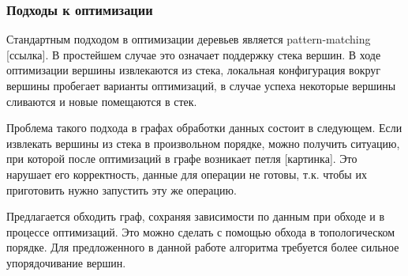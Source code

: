 \subsubsection{Подходы к оптимизации}

Стандартным подходом в оптимизации деревьев является pattern-matching [ссылка]. В простейшем случае это означает поддержку стека вершин. В ходе оптимизации вершины извлекаются из стека, локальная конфигурация вокруг вершины пробегает варианты оптимизаций, в случае успеха некоторые вершины сливаются и новые помещаются в стек.

Проблема такого подхода в графах обработки данных состоит в следующем. Если извлекать вершины из стека в произвольном порядке, можно получить ситуацию, при которой после оптимизаций в графе возникает петля [картинка]. Это нарушает его корректность, данные для операции не готовы, т.к. чтобы их приготовить нужно запустить эту же операцию.

Предлагается обходить граф, сохраняя зависимости по данным при обходе и в процессе оптимизаций. Это можно сделать с помощью обхода в топологическом порядке. Для предложенного в данной работе алгоритма требуется более сильное упорядочивание вершин.
